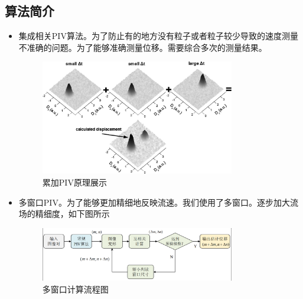 \documentclass[12pt]{article}
\begin{document}
    \subsection{算法简介}
    \begin{itemize}
    \item 集成相关PIV算法。为了防止有的地方没有粒子或者粒子较少导致的速度测量不准确的问题。为了能够准确测量位移。需要综合多次的测量结果。
    \begin{figure}
        \centering
        \includegraphics[width=0.8\textwidth]{Images/累加PIV原理展示.png}
        \caption{累加PIV原理展示}
    \end{figure}
    \item 多窗口PIV。为了能够更加精细地反映流速。我们使用了多窗口。逐步加大流场的精细度，如下图所示
    
    \begin{figure}
    \centering
    \includegraphics[width=0.8\textwidth]{Images/多窗口示意图.png}
    \caption{多窗口计算流程图}
    \end{figure}

    \end{itemize}
\end{document}
